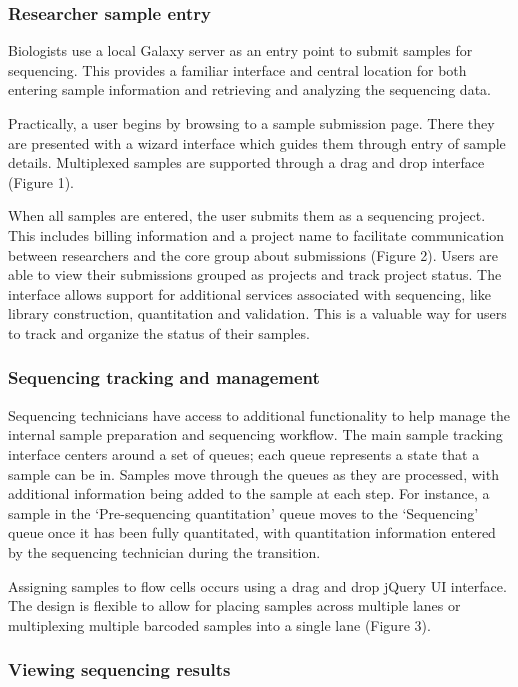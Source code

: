 \documentclass[10pt]{bmc_article}
\newenvironment{bmcformat}{\begin{raggedright}\baselineskip20pt\sloppy\setboolean{publ}{false}}{\end{raggedright}\baselineskip20pt\sloppy}
\begin{document}
\begin{bmcformat}
\subsubsection*{Researcher sample entry}

Biologists use a local Galaxy server as an entry point to submit
samples for sequencing. This provides a familiar interface and central
location for both entering sample information and retrieving and
analyzing the sequencing data.

Practically, a user begins by browsing to a sample submission
page. There they are presented with a wizard interface which guides
them through entry of sample details. Multiplexed samples are
supported through a drag and drop interface (Figure 1).

When all samples are entered, the user submits them as a sequencing
project. This includes billing information and a project name to
facilitate communication between researchers and the core group
about submissions (Figure 2). Users are able to view their submissions
grouped as projects and track project status. The interface
allows support for additional services associated with sequencing,
like library construction, quantitation and validation. This is a
valuable way for users to track and organize the status of their
samples.

\subsubsection*{Sequencing tracking and management}

Sequencing technicians have access to additional
functionality to help manage the internal sample preparation and
sequencing workflow. The main sample tracking interface centers around
a set of queues; each queue represents a state that a sample can be
in. Samples move through the queues as they are processed, with
additional information being added to the sample at each step. For
instance, a sample in the ‘Pre-sequencing quantitation’ queue moves to
the ‘Sequencing’ queue once it has been fully quantitated, with
quantitation information entered by the sequencing technician during
the transition.

Assigning samples to flow cells occurs using a drag and drop jQuery UI
interface. The design is flexible to allow for placing samples across
multiple lanes or multiplexing multiple barcoded samples into a single
lane (Figure 3).

\subsubsection*{Viewing sequencing results}


\end{bmcformat}
\end{document}
